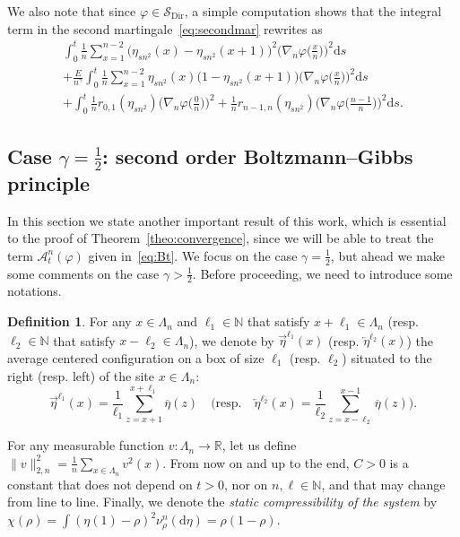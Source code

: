 \documentclass[10pt]{amsart}
\theoremstyle{definition}\newtheorem{defi}[theo]{Definition}\newtheorem{rema}[theo]{Remark}\newtheorem{exam}[theo]{Example}\newtheorem{exem}[theo]{Example}\newtheorem{nota}[theo]{Notation}
\DeclareMathOperator{\Dir}{Dir}
\newcommand{\bb}[1]{{\mathbb #1}}
\newcommand{\mc}[1]{{\mathcal #1}}
\renewcommand{\mc}[1]{{\mathcal #1}}
\newcommand{\SD}{\ensuremath{\mc S_{\Dir}}}
\renewcommand\vec[1]{\overrightarrow{#1}}
\newcommand\vecleft[1]{\overleftarrow{#1}}
\renewcommand{\bar}{\overline}
\newcommand*{\dd}{\mathrm{d}}
\newcommand*{\ds}{\dd s}
\renewcommand{\tfrac}{\frac}
\begin{document}
We also note that since $\varphi\in \SD$, a simple computation shows that the integral term in the second martingale~\eqref{eq:secondmar} rewrites as
\begin{multline}\label{eq:QV_density}
\int_0^t\frac{1}{n}\sum_{x=1}^{n-2} \big(\eta_{sn^2}(x)-\eta_{sn^2}(x+1)\big)^2 \Big(\nabla_n\varphi\Big(\frac{x}{n}\Big)\Big)^2\ds \\
+ \frac{E}{n^\gamma} \int_0^t\frac{1}{n}\sum_{x=1}^{n-2}\eta_{sn^2}(x)\big(1-\eta_{sn^2}(x+1)\big) \Big(\nabla_n\varphi\Big(\frac{x}{n}\Big)\Big)^2\ds\\
+ \int_0^t\frac{1}{n} r_{0,1}(\eta_{sn^2}) \Big(\nabla_n\varphi\Big(\frac{0}{n}\Big)\Big)^2+\frac{1}{n} r_{n-1,n}(\eta_{sn^2}) \Big(\nabla_n\varphi\Big(\frac{n-1}{n}\Big)\Big)^2\ds.
\end{multline}

\subsection{Case \texorpdfstring{$\gamma=\tfrac12$}{gamma=1/2}: second order Boltzmann--Gibbs principle} \label{sec:BG}

In this section we state another important result of this work, which is essential to the proof of Theorem~\ref{theo:convergence}, since we will be able to treat the term $ \mc A_t^n(\varphi)$ given in~\eqref{eq:Bt}. We focus on the case $\gamma=\frac12$, but ahead we make some comments on the case $\gamma>\frac12$. Before proceeding, we need to introduce some notations.

\begin{defi}
For any $x\in\Lambda_n$ and $\ell_1 \in \bb N$ that satisfy $x+\ell_1 \in \Lambda_n$ (resp. $\ell_2 \in \bb N$ that satisfy $x-\ell_2 \in \Lambda_n$), we denote by $\vec\eta^{\ell_1}(x)$ (resp. $\vecleft\eta^{\ell_2}(x)$) the average centered configuration on a box of size $\ell_1$ (resp. $\ell_2$) situated to the right (resp. left) of the site $x \in \Lambda_n$:
\[
\vec\eta^{\ell_1}(x)=\frac{1}{\ell_1}\sum_{z=x+1}^{x+\ell_1} \bar\eta(z)\quad \bigg(\text{resp.} \quad
\vecleft\eta^{\ell_2}(x)=\frac{1}{\ell_2}\sum_{z=x-\ell_2}^{x-1}\bar\eta(z)\bigg).
\]
\end{defi}

For any measurable function $v:\Lambda_n\to\bb R$, let us define $\|v\|_{2,n}^2=\frac{1}{n}\sum_{x\in\Lambda_n}v^2(x).$ From now on and up to the end, $C>0$ is a constant that does not depend on $t > 0$, nor on $n,\ell \in \mathbb{N}$, and that may change from line to line. Finally, we denote the \emph{static compressibility of the system} by $\chi(\rho) = \int (\eta(1)-\rho)^2 \nu_\rho^n(\dd\eta) = \rho(1-\rho)$.
\end{document}
